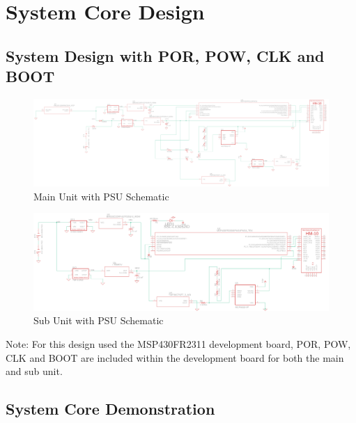 \section{System Core Design}
\subsection{System Design with POR, POW, CLK and BOOT}
\begin{landscape}
  \begin{center}
  \begin{figure}[H]
    \includegraphics[width=\pdfpagewidth,height=0.65\textheight]{../System-Schematic-Diagrams/Figures/main-unit-and-psu.png}
    \caption{Main Unit with PSU Schematic}
    \label{fig:main-with-psu-schematic}
  \end{figure}
  \end{center}
  \begin{center}
  \begin{figure}[H]
    \includegraphics[width=\pdfpagewidth,height=0.65\textheight]{../System-Schematic-Diagrams/Figures/sub-unit-and-psu.png}
    \caption{Sub Unit with PSU Schematic}
    \label{fig:sub-with-psu-schematic}
  \end{figure}
  \end{center}
\end{landscape}
Note: For this design used the MSP430FR2311 development board, POR, POW, CLK and BOOT are included within the development board for both the main and sub unit.
\subsection{System Core Demonstration}
